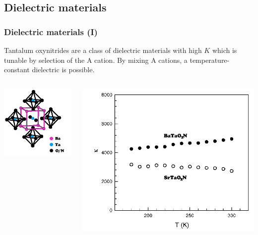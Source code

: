 
\subsection[Dielectric materials]{Dielectric materials}
\begin{frame}
  \frametitle{Dielectric materials (I)}

  Tantalum oxynitrides are a class of dielectric materials with high
  $K$ which is tunable by selection of the A cation.  By mixing A
  cations, a temperature-constant dielectric is possible.
  \begin{columns}
    \begin{column}{0.5\linewidth}
      \begin{center}
        \includegraphics[width=0.6\linewidth]{xas/perovskite.png}
      \end{center}
    \end{column}
    \begin{column}{0.5\linewidth}
      \begin{center}
        \includegraphics[width=0.9\linewidth]{xas/bton_permit.png}
      \end{center}
    \end{column}
  \end{columns}


\end{frame}

